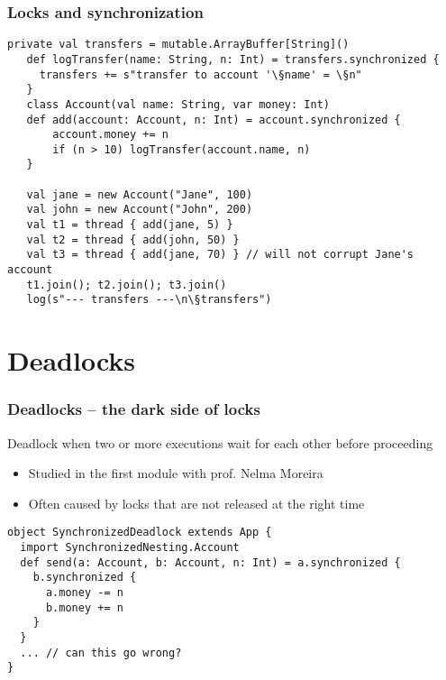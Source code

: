 \documentclass[aspectratio=169]{beamer}
\begin{document}
\begin{frame}[fragile]\frametitle{Locks and synchronization}
\begin{lstlisting}[emph={assert,sleep,log,thread,join,synchronized}]
   private val transfers = mutable.ArrayBuffer[String]()
   def logTransfer(name: String, n: Int) = transfers.synchronized {
     transfers += s"transfer to account '\§name' = \§n"
   }
   class Account(val name: String, var money: Int)
   def add(account: Account, n: Int) = account.synchronized {
       account.money += n
       if (n > 10) logTransfer(account.name, n)
   }

   val jane = new Account("Jane", 100)
   val john = new Account("John", 200)
   val t1 = thread { add(jane, 5) }
   val t2 = thread { add(john, 50) }
   val t3 = thread { add(jane, 70) } // will not corrupt Jane's account
   t1.join(); t2.join(); t3.join()
   log(s"--- transfers ---\n\§transfers")
\end{lstlisting}
\end{frame}


\section{Deadlocks}

\begin{frame}[fragile]\frametitle{Deadlocks -- the dark side of locks}

\begin{alertblock}{Deadlock}
  when two or more executions wait for each other before proceeding
\end{alertblock}

\begin{itemize}
  \item Studied in the first module with prof. Nelma Moreira
  \item Often caused by locks that are not released at the right time
\end{itemize}

\begin{lstlisting}[emph={assert,sleep,log,thread,join,synchronized}]
object SynchronizedDeadlock extends App {
  import SynchronizedNesting.Account
  def send(a: Account, b: Account, n: Int) = a.synchronized {
    b.synchronized {
      a.money -= n
      b.money += n
    }
  }
  ... // can this go wrong?
}
\end{lstlisting}
\end{frame}
\end{document}
